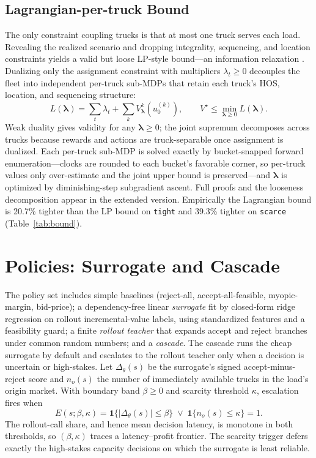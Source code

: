\documentclass[numbered]{trbunofficial}
\begin{document}
\subsection{Lagrangian-per-truck Bound}
The only constraint coupling trucks is that at most one truck serves each
load. Revealing the realized scenario and dropping integrality, sequencing,
and location constraints yields a valid but loose LP-style bound---an
information relaxation \citep{brown2010information}. Dualizing only the
assignment constraint with multipliers $\lambda_t \geq 0$ decouples the
fleet into independent per-truck sub-MDPs that retain each truck's HOS,
location, and sequencing structure:
\begin{equation}
L(\boldsymbol\lambda) = \sum_t \lambda_t + \sum_k V^k_{\boldsymbol\lambda}(u^{(k)}_0),
\qquad V^\star \leq \min_{\boldsymbol\lambda \geq 0} L(\boldsymbol\lambda).
\end{equation}
Weak duality gives validity for any $\boldsymbol\lambda \geq 0$; the joint
supremum decomposes across trucks because rewards and actions are
truck-separable once assignment is dualized. Each per-truck sub-MDP is
solved exactly by bucket-snapped forward enumeration---clocks are rounded
to each bucket's favorable corner, so per-truck values only over-estimate
and the joint upper bound is preserved---and $\boldsymbol\lambda$ is
optimized by diminishing-step subgradient ascent. Full proofs and the
looseness decomposition appear in the extended version. Empirically the
Lagrangian bound is 20.7\% tighter than the LP bound on \texttt{tight} and
39.3\% tighter on \texttt{scarce} (Table~\ref{tab:bound}).

\section{Policies: Surrogate and Cascade}
The policy set includes simple baselines (reject-all, accept-all-feasible,
myopic-margin, bid-price); a dependency-free linear \textit{surrogate} fit
by closed-form ridge regression on rollout incremental-value labels, using
standardized features and a feasibility guard; a finite \textit{rollout
teacher} that expands accept and reject branches under common random
numbers; and a \textit{cascade}. The cascade runs the cheap surrogate by
default and escalates to the rollout teacher only when a decision is
uncertain or high-stakes. Let $\Delta_\theta(s)$ be the surrogate's signed
accept-minus-reject score and $n_o(s)$ the number of immediately available
trucks in the load's origin market. With boundary band $\beta \geq 0$ and
scarcity threshold $\kappa$, escalation fires when
\begin{equation}
E(s;\beta,\kappa) = \mathbf{1}\{|\Delta_\theta(s)| \leq \beta\} \;\vee\; \mathbf{1}\{n_o(s) \leq \kappa\} = 1.
\end{equation}
The rollout-call share, and hence mean decision latency, is monotone in
both thresholds, so $(\beta,\kappa)$ traces a latency--profit frontier. The
scarcity trigger defers exactly the high-stakes capacity decisions on which
the surrogate is least reliable.
\end{document}

